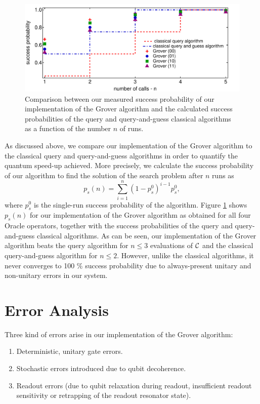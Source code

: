 \begin{figure}[ht!]
	\centering
	\includegraphics[width=1\textwidth]{"./material/mathematica/comparision_grover_classical"}
	\caption{Comparison between our measured success probability of our implementation of the Grover algorithm and the calculated success probabilities of the query and query-and-guess classical algorithms as a function of the number $n$ of runs.}
	\label{fig:comparison_grover_classical}
\end{figure}

As discussed above, we compare our implementation of the Grover algorithm to the classical query and query-and-guess algorithms in order to quantify the quantum speed-up achieved. More precisely, we calculate the success probability of our algorithm to find the solution of the search problem after $n$ runs as
%
\begin{equation}
p_s(n) = \sum\limits_{i=1}^n (1-p_s^0)^{i-1}p_s^0,
\end{equation}
%
where $p_s^0$ is the single-run success probability of the algorithm. Figure \ref{fig:comparison_grover_classical} shows $p_s(n)$ for our implementation of the Grover algorithm as obtained for all four Oracle operators, together with the success probabilities of the query and query-and-guess classical algorithms. As can be seen, our implementation of the Grover algorithm beats the query algorithm for $n\le $3 evaluations of $\Or$ and the classical query-and-guess algorithm for $n\le 2$. However, unlike the classical algorithms, it never converges to 100 \% success probability due to always-present unitary and non-unitary errors in our system. 

\section{Error Analysis}

Three kind of errors arise in our implementation of the Grover algorithm:

\begin{enumerate}
	\item Deterministic, unitary gate errors.
	\item Stochastic errors introduced due to qubit decoherence.
	\item Readout errors (due to qubit relaxation during readout, insufficient readout sensitivity or retrapping of the readout resonator state).
\end{enumerate}

